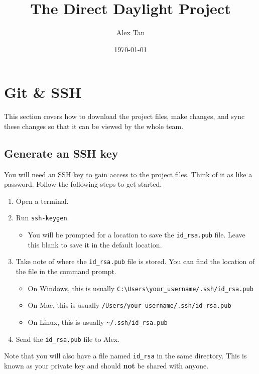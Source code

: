 \documentclass[11pt]{article}
\begin{document}
	
\begin{titlepage}
\title{The Direct Daylight Project}
\author{Alex Tan}
\date{\today}
\maketitle{}
\thispagestyle{empty}
\end{titlepage}

\tableofcontents
\thispagestyle{empty}
\clearpage

\setcounter{page}{1}

\section{Git \& SSH}
This section covers how to download the project files, make changes, and sync these changes so that it can be viewed by the whole team.
\subsection{Generate an SSH key}
You will need an SSH key to gain access to the project files. Think of it as like a password. Follow the following steps to get started.
\begin{enumerate}
\item Open a terminal.
\item Run \lstinline{ssh-keygen}.
\begin{itemize}
\item You will be prompted for a location to save the \lstinline{id_rsa.pub} file. Leave this blank to save it in the default location.
\end{itemize}
\item Take note of where the \lstinline{id_rsa.pub} file is stored. You can find the location of the file in the command prompt.
\begin{itemize}
\item On Windows, this is usually \lstinline{C:\Users\your_username/.ssh/id_rsa.pub}
\item On Mac, this is usually \lstinline{/Users/your_username/.ssh/id_rsa.pub}
\item On Linux, this is usually \lstinline{~/.ssh/id_rsa.pub}
\end{itemize}
\item Send the \lstinline{id_rsa.pub} file to Alex.
\end{enumerate}
Note that you will also have a file named \lstinline{id_rsa} in the same directory. This is known as your private key and should \textbf{not} be shared with anyone.
\end{document}
